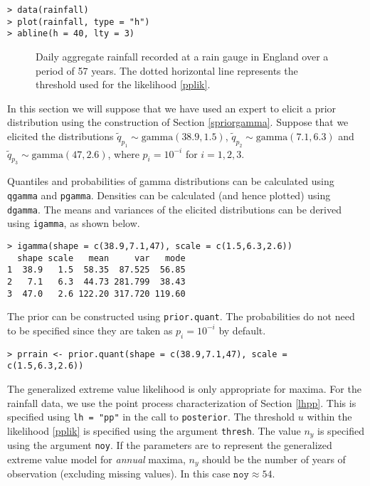 \documentclass[11pt,a4paper]{article}
\begin{document}
\begin{verbatim}
> data(rainfall)
> plot(rainfall, type = "h")
> abline(h = 40, lty = 3)
\end{verbatim}

\begin{figure}
\begin{center}
   \vspace{-1.5cm}
\end{center}
\caption{Daily aggregate rainfall recorded at a rain gauge in England
  over a period of 57 years. The dotted horizontal line represents the
  threshold used for the likelihood \eqref{pplik}.}
\label{raindata}
\end{figure}

In this section we will suppose that we have used an expert to elicit
a prior distribution using the construction of Section
\ref{spriorgamma}.  Suppose that we elicited the distributions
$\tilde{q}_{p_1} \sim \text{gamma}(38.9,1.5)$, $\tilde{q}_{p_2} \sim
\text{gamma}(7.1,6.3)$ and $\tilde{q}_{p_3} \sim
\text{gamma}(47,2.6)$, where $p_i = 10^{-i}$ for $i=1,2,3$.

Quantiles and probabilities of gamma distributions can be calculated
using \verb+qgamma+ and \verb+pgamma+.  Densities can be calculated
(and hence plotted) using \verb+dgamma+.  The means and variances of
the elicited distributions can be derived using \verb+igamma+, as
shown below.

\begin{verbatim}
> igamma(shape = c(38.9,7.1,47), scale = c(1.5,6.3,2.6))
  shape scale   mean     var   mode
1  38.9   1.5  58.35  87.525  56.85
2   7.1   6.3  44.73 281.799  38.43
3  47.0   2.6 122.20 317.720 119.60
\end{verbatim}

The prior can be constructed using \verb+prior.quant+.  The
probabilities do not need to be specified since they are taken as $p_i
= 10^{-i}$ by default.

\begin{verbatim}
> prrain <- prior.quant(shape = c(38.9,7.1,47), scale = c(1.5,6.3,2.6))
\end{verbatim}

The generalized extreme value likelihood is only appropriate for
maxima.  For the rainfall data, we use the point process
characterization of Section \ref{lhpp}.  This is specified using
\verb+lh = "pp"+ in the call to \verb+posterior+.  The threshold $u$
within the likelihood \eqref{pplik} is specified using the argument
\verb+thresh+.  The value $n_y$ is specified using the argument
\verb+noy+.  If the parameters are to represent the generalized
extreme value model for \emph{annual} maxima, $n_y$ should be the
number of years of observation (excluding missing values).  In this
case $\texttt{noy} \approx 54$.
\end{document}
